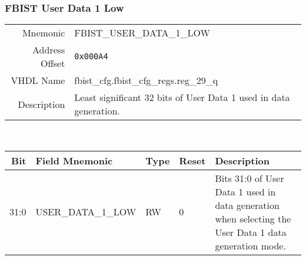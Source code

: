\subsubsection{FBIST User Data 1 Low}
\begin{tabular}{ r | p{350px} }
  Mnemonic       & FBIST\_USER\_DATA\_1\_LOW              \\
  Address Offset & \texttt{0x000A4}                        \\
  VHDL Name      &  fbist\_cfg.fbist\_cfg\_regs.reg\_29\_q \\ \hline

  Description &
  Least significant 32 bits of User Data 1 used in data generation. \\
\end{tabular}
\\
\begin{tabularx}{\textwidth}{r|l|l|l|X}
  \hline
  Bit   & Field Mnemonic     & Type & Reset & Description \\ \hline

  31:0  & USER\_DATA\_1\_LOW & RW   & 0     &

  Bits 31:0 of User Data 1 used in data generation when selecting the
  User Data 1 data generation mode. \\
\end{tabularx}

